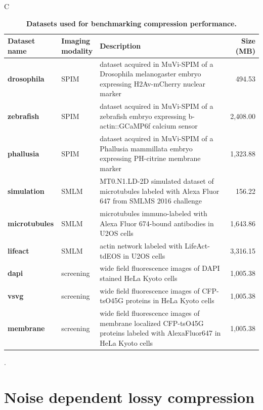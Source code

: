 \documentclass{diploma_style}
\begin{document}
\begin{table}[tbp]
\begin{small}
\renewcommand{\arraystretch}{2}C
\centering
\begin{tabular}{llp{7cm}r}
	\textbf{Dataset name} & \parbox[c]{2cm}{\textbf{Imaging\\modality}} & \textbf{Description} & \textbf{Size (MB)} \\
	\hline
	\hline
	\textbf{drosophila} & SPIM & dataset acquired in MuVi-SPIM of a Drosophila melanogaster embryo expressing H2Av-mCherry nuclear marker & 494.53 \\ \hline
	\textbf{zebrafish} & SPIM & dataset acquired in MuVi-SPIM of a zebrafish embryo expressing b-actin::GCaMP6f calcium sensor & 2,408.00 \\ \hline
	\textbf{phallusia} & SPIM & dataset acquired in MuVi-SPIM of a Phallusia mammillata embryo expressing PH-citrine membrane marker & 1,323.88  \\ \hline
	\textbf{simulation} & SMLM & MT0.N1.LD-2D simulated dataset of microtubules labeled with Alexa Fluor 647 from SMLMS 2016 challenge & 156.22 \\ \hline
	\textbf{microtubules} & SMLM & microtubules immuno-labeled with Alexa Fluor 674-bound antibodies in U2OS cells & 1,643.86  \\ \hline
	\textbf{lifeact} & SMLM & actin network labeled with LifeAct-tdEOS in U2OS cells & 3,316.15  \\ \hline
	\textbf{dapi} & screening & wide field fluorescence images of DAPI stained HeLa Kyoto cells \cite{simpson_genome-wide_2012} & 1,005.38 \\ \hline
	\textbf{vsvg} & screening & wide field fluorescence images of CFP-tsO45G proteins in HeLa Kyoto cells \cite{simpson_genome-wide_2012} & 1,005.38  \\ \hline
	\textbf{membrane} & screening & wide field fluorescence images of membrane localized CFP-tsO45G proteins labeled with AlexaFluor647 in HeLa Kyoto cells \cite{simpson_genome-wide_2012} & 1,005.38  \\ 
\end{tabular}
\caption{\textbf{Datasets used for benchmarking compression performance.}}.
\label{tab:datasets}
\end{small}
\end{table}

\section{Noise dependent lossy compression}
\end{document}

